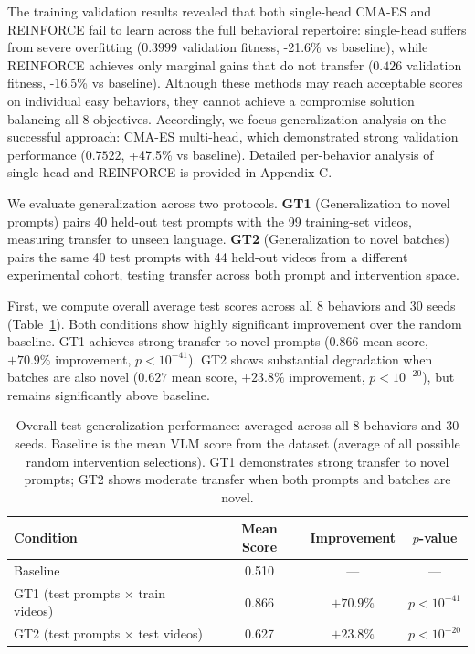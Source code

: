 \documentclass{article}
\begin{document}
The training validation results revealed that both single-head CMA-ES and REINFORCE fail to learn across the full behavioral repertoire: single-head suffers from severe overfitting ($0.3999$ validation fitness, -21.6\% vs baseline), while REINFORCE achieves only marginal gains that do not transfer ($0.426$ validation fitness, -16.5\% vs baseline). Although these methods may reach acceptable scores on individual easy behaviors, they cannot achieve a compromise solution balancing all 8 objectives. Accordingly, we focus generalization analysis on the successful approach: CMA-ES multi-head, which demonstrated strong validation performance ($0.7522$, +47.5\% vs baseline). Detailed per-behavior analysis of single-head and REINFORCE is provided in Appendix C.

We evaluate generalization across two protocols. \textbf{GT1} (Generalization to novel prompts) pairs 40 held-out test prompts with the 99 training-set videos, measuring transfer to unseen language. \textbf{GT2} (Generalization to novel batches) pairs the same 40 test prompts with 44 held-out videos from a different experimental cohort, testing transfer across both prompt and intervention space.

First, we compute overall average test scores across all 8 behaviors and 30 seeds (Table~\ref{tab:test_overall}). Both conditions show highly significant improvement over the random baseline. GT1 achieves strong transfer to novel prompts ($0.866$ mean score, $+70.9\%$ improvement, $p < 10^{-41}$). GT2 shows substantial degradation when batches are also novel ($0.627$ mean score, $+23.8\%$ improvement, $p < 10^{-20}$), but remains significantly above baseline.

\begin{table}[h]
\centering
\caption{Overall test generalization performance: averaged across all 8 behaviors and 30 seeds. Baseline is the mean VLM score from the dataset (average of all possible random intervention selections). GT1 demonstrates strong transfer to novel prompts; GT2 shows moderate transfer when both prompts and batches are novel.}
\label{tab:test_overall}
\small
\begin{tabular}{lccc}
\toprule
Condition & Mean Score & Improvement & $p$-value \\
\midrule
Baseline & 0.510 & — & — \\
GT1 (test prompts × train videos) & 0.866 & $+70.9\%$ & $p < 10^{-41}$ \\
GT2 (test prompts × test videos) & 0.627 & $+23.8\%$ & $p < 10^{-20}$ \\
\bottomrule
\end{tabular}
\end{table}
\end{document}
